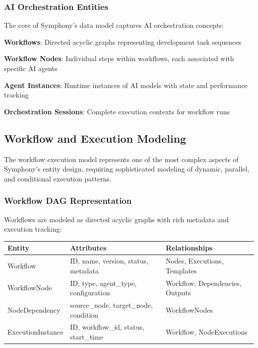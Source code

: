 \subsubsection*{AI Orchestration Entities}

The core of Symphony's data model captures AI orchestration concepts:

\begin{expandedlist}
    \item \textbf{Workflows}: Directed acyclic graphs representing development task sequences
    \item \textbf{Workflow Nodes}: Individual steps within workflows, each associated with specific AI agents
    \item \textbf{Agent Instances}: Runtime instances of AI models with state and performance tracking
    \item \textbf{Orchestration Sessions}: Complete execution contexts for workflow runs
\end{expandedlist}

\subsection*{Workflow and Execution Modeling}

The workflow execution model represents one of the most complex aspects of Symphony's entity design, requiring sophisticated modeling of dynamic, parallel, and conditional execution patterns.

\subsubsection*{Workflow DAG Representation}

Workflows are modeled as directed acyclic graphs with rich metadata and execution tracking:

\begin{center}
\begin{tabular}{@{}lll@{}}
\toprule
\textbf{Entity} & \textbf{Attributes} & \textbf{Relationships} \\
\midrule
Workflow & ID, name, version, status, metadata & Nodes, Executions, Templates \\
WorkflowNode & ID, type, agent\_type, configuration & Workflow, Dependencies, Outputs \\
NodeDependency & source\_node, target\_node, condition & WorkflowNodes \\
ExecutionInstance & ID, workflow\_id, status, start\_time & Workflow, NodeExecutions \\
\bottomrule
\end{tabular}
\end{center}

